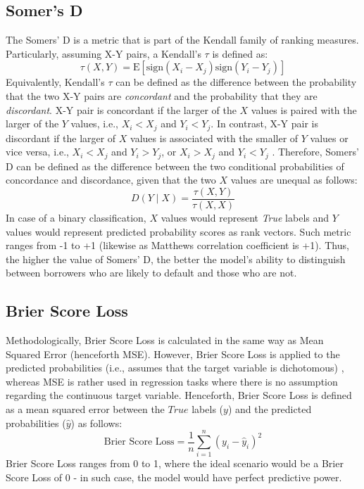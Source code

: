 \subsection{Somer's D}

The Somers' D is a metric that is part of the Kendall family of ranking measures. Particularly, assuming X-Y pairs, a Kendall's $\tau$ is defined as:
\begin{equation}\label{eq}
    \tau\left(X,Y\right) = \text{E} \left[ \text{sign}(X_i - X_j) \text{sign} (Y_i - Y_j) \right]
\end{equation}
Equivalently, Kendall's $\tau$ can be defined as the difference between the probability that the two X-Y pairs are \textit{concordant} and the probability that they are \textit{discordant}. X-Y pair is concordant if the larger of the $X$ values is paired with the larger of the $Y$ values, i.e., $X_i < X_j$ and $Y_i < Y_j$.
In contrast, X-Y pair is discordant if the larger of $X$ values is associated with the smaller of $Y$ values or vice versa, i.e., $X_i < X_j$ and $Y_i > Y_j$, or $X_i > X_j$ and $Y_i < Y_j$ \citep{newson2002parameters}.
\newpage
Therefore, Somers' D can be defined as the difference between the two conditional probabilities of concordance and discordance, given that the two $X$ values are unequal \citep{newson2014interpretation} as follows:
\begin{equation}
    D\left(Y \mid X\right) = \frac{\tau\left(X,Y\right)}{\tau\left(X,X\right)}
\end{equation}
In case of a binary classification, $X$ values would represent \textit{True} labels and $Y$ values would represent predicted probability scores as rank vectors. Such metric ranges from -1 to +1 (likewise as Matthews correlation coefficient is +1). Thus, the higher the value of Somers' D, the better the model's ability to distinguish between borrowers who are likely to default and those who are not.


\subsection{Brier Score Loss}
Methodologically, Brier Score Loss is calculated in the same way as Mean Squared Error (henceforth MSE). However, Brier Score Loss is applied to the predicted probabilities (i.e., assumes that the target variable is dichotomous) \citep{comotto2022evaluation}, whereas MSE is rather used in regression tasks where there is no assumption regarding the continuous target variable.
Henceforth, Brier Score Loss is defined as a mean squared error between the $True$ labels ($y$) and the predicted probabilities ($\hat{y}$) as follows:
\begin{equation}\label{eq}
    \text{Brier Score Loss} = \frac{1}{n} \sum_{i=1}^{n} (y_i - \hat{y}_i)^2
\end{equation}
Brier Score Loss ranges from 0 to 1, where the ideal scenario would be a Brier Score Loss of 0 - in such case, the model would have perfect predictive power.


